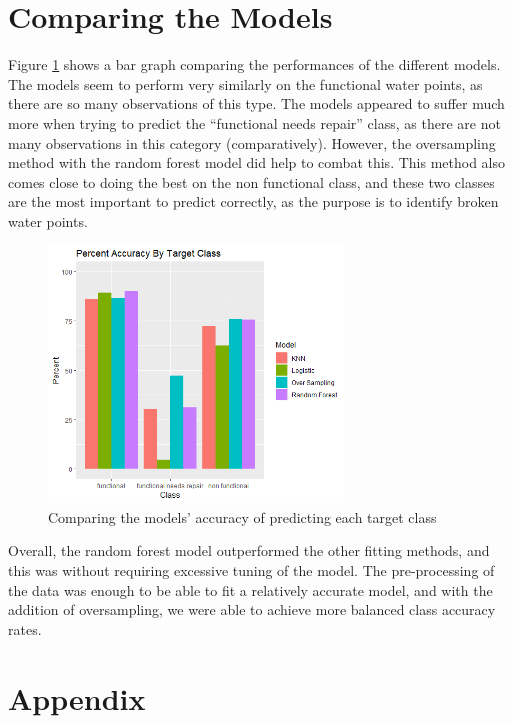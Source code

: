 \documentclass{article}
\begin{document}










\section{Comparing the Models}
Figure \ref{fig:modelComp} shows a bar graph comparing the performances of the different models.  The models seem to perform very similarly on the functional water points, as there are so many observations of this type.  The models appeared to suffer much more when trying to predict the ``functional needs repair'' class, as there are not many observations in this  category (comparatively).  However, the oversampling method with the random forest model did help to combat this. This method also comes close to doing the best on the non functional class, and these two classes are the most important to predict correctly, as the purpose is to identify broken water points.

\begin{figure}[!h]
    \centering
    \includegraphics[width = 0.7\textwidth]{Figures/percentAccuracyByClass.png}
    \caption{Comparing the models' accuracy of predicting each target class}
    \label{fig:modelComp}
\end{figure}

Overall, the random forest model outperformed the other fitting methods, and this was without requiring excessive tuning of the model.  The pre-processing of the data was enough to be able to fit a relatively accurate model, and with the addition of oversampling, we were able to achieve more balanced class accuracy rates.

\newpage
\section{Appendix}



\end{document}
